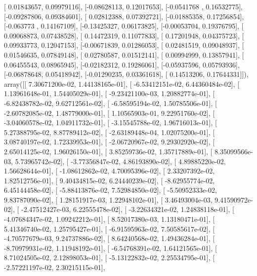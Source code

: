 \documentclass{article}
\begin{document}
       [ 0.01843657,  0.09979116],
       [-0.08628113,  0.12017653],
       [-0.0541768 ,  0.16532775],
       [-0.09287806,  0.09384601],
       [ 0.02812388,  0.07392721],
       [-0.01885358,  0.17256854],
       [-0.063773  ,  0.14167109],
       [-0.13425327,  0.06173825],
       [-0.00053704,  0.19376795],
       [ 0.09068873,  0.07438528],
       [ 0.14472319,  0.11077833],
       [ 0.17201948,  0.04375723],
       [ 0.09933773,  0.12047153],
       [-0.00671839,  0.01286053],
       [ 0.02481519,  0.09048937],
       [ 0.01546635,  0.07849148],
       [ 0.02780587,  0.01512141],
       [ 0.00994999,  0.13857941],
       [ 0.06455543,  0.08965945],
       [-0.02182312,  0.19286061],
       [-0.05937596,  0.05793936],
       [-0.06878648,  0.05418942],
       [-0.01290235,  0.03361618],
       [ 0.14513206,  0.17644331]]), array([[  7.30671200e-02,   1.44138165e-01],
       [ -6.53412151e-02,   6.44360484e-02],
       [  1.13961648e-01,   1.54405029e-01],
       [ -9.23421100e-03,   1.20882774e-01],
       [ -6.82438782e-02,   9.62712561e-02],
       [ -6.58595194e-02,   1.50785506e-01],
       [ -2.60782085e-02,   1.48779000e-01],
       [  1.10565903e-01,   9.22951760e-02],
       [ -3.04060578e-02,   1.04911732e-01],
       [ -3.15545788e-02,   1.96716013e-01],
       [  5.27388795e-02,   8.87789412e-02],
       [ -2.63189448e-04,   1.02075200e-01],
       [  3.08740197e-02,   1.72339953e-01],
       [ -2.06720967e-02,   9.29302920e-02],
       [  2.65014125e-02,   1.96026150e-01],
       [  3.85259736e-02,   1.35717889e-01],
       [  8.35099566e-03,   5.73965742e-02],
       [ -3.77356847e-02,   4.86193890e-02],
       [  4.89885220e-02,   1.56628644e-01],
       [ -1.08612862e-02,   4.70095396e-02],
       [  2.33207392e-02,   1.82512756e-01],
       [  9.40434815e-02,   6.24440239e-02],
       [ -8.62955774e-02,   6.45144458e-02],
       [ -5.88413876e-02,   7.52984850e-02],
       [ -5.50952333e-02,   9.83787090e-02],
       [  1.28151917e-03,   1.22948102e-01],
       [  3.46493004e-03,   9.41590972e-02],
       [ -2.47512427e-03,   6.22555478e-02],
       [ -3.22634321e-02,   1.24838118e-01],
       [ -4.07684347e-02,   1.09242212e-01],
       [  8.52017380e-03,   1.13180471e-01],
       [  5.41346740e-02,   1.25795427e-01],
       [ -6.91595963e-02,   7.50585617e-02],
       [ -4.70577679e-03,   9.24737886e-02],
       [  8.64240568e-02,   1.49436284e-01],
       [ -8.70979931e-02,   1.11948192e-01],
       [ -6.54768391e-02,   1.64121565e-01],
       [  8.71024505e-02,   2.12898053e-01],
       [ -5.13122832e-02,   2.25534795e-01],
       [ -2.57221197e-02,   2.30215115e-01],
\end{document}
